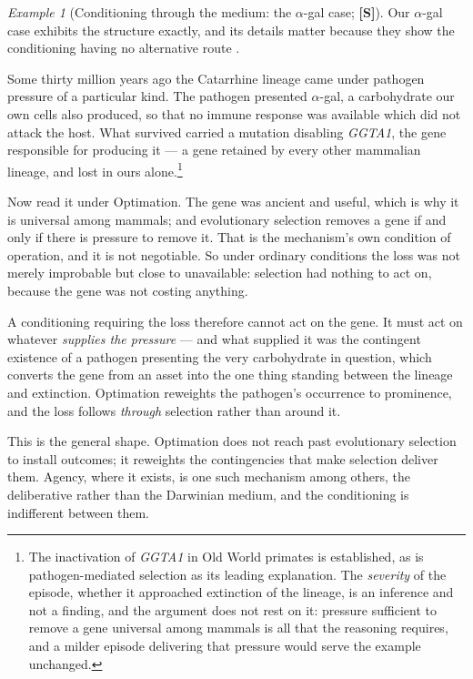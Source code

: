 \documentclass[11pt]{article}
\numberwithin{equation}{section}
\theoremstyle{plain}
\theoremstyle{definition}
\theoremstyle{remark}
\newtheorem{example}[theorem]{Example}
\begin{document}
\begin{example}[Conditioning through the medium: the
$\alpha$-gal case; \textbf{[S]}]\label{gc:ex:medium}
Our $\alpha$-gal case exhibits the structure exactly, and its
details matter because they show the conditioning having no alternative
route \cite{Nexus}.

Some thirty million years ago the Catarrhine lineage came under
pathogen pressure of a particular kind. The pathogen presented
$\alpha$-gal, a carbohydrate our own cells also produced, so that no
immune response was available which did not attack the host. What
survived carried a mutation disabling \textit{GGTA1}, the gene
responsible for producing it --- a gene retained by every other
mammalian lineage, and lost in ours alone.\footnote{The inactivation of
\textit{GGTA1} in Old World primates is established, as is
pathogen-mediated selection as its leading explanation. The
\emph{severity} of the episode, whether it approached extinction of
the lineage, is an inference and not a finding, and the argument does
not rest on it: pressure sufficient to remove a gene universal among
mammals is all that the reasoning requires, and a milder episode
delivering that pressure would serve the example unchanged.}

Now read it under Optimation. The gene was ancient and useful, which is
why it is universal among mammals; and evolutionary selection removes a
gene if and only if there is pressure to remove it. That is the
mechanism's own condition of operation, and it is not negotiable. So
under ordinary conditions the loss was not merely improbable but close
to unavailable: selection had nothing to act on, because the gene was
not costing anything.

A conditioning requiring the loss therefore cannot act on the gene. It
must act on whatever \emph{supplies the pressure} --- and what supplied
it was the contingent existence of a pathogen presenting the very
carbohydrate in question, which converts the gene from an asset into the
one thing standing between the lineage and extinction. Optimation
reweights the pathogen's occurrence to prominence, and the loss follows
\emph{through} selection rather than around it.

This is the general shape. Optimation does not reach past evolutionary
selection to install outcomes; it reweights the contingencies that make
selection deliver them. Agency, where it exists, is one such mechanism
among others, the deliberative rather than the Darwinian medium, and the conditioning is indifferent between them.
\end{example}
\end{document}
